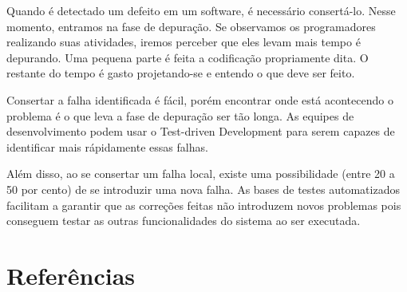 \documentclass[12pt]{article}
\begin{document}
  Quando é detectado um defeito em um software, é necessário consertá-lo. Nesse
  momento, entramos na fase de depuração. Se observamos os programadores 
  realizando suas atividades, iremos perceber que eles levam mais tempo é 
  depurando. Uma pequena parte é feita a codificação propriamente dita. O 
  restante do tempo é gasto projetando-se e entendo o que deve ser feito.

  Consertar a falha identificada é fácil, porém encontrar onde está acontecendo
  o problema é o que leva a fase de depuração ser tão longa. As equipes de 
  desenvolvimento podem usar o Test-driven Development para serem capazes de
  identificar mais rápidamente essas falhas.

  Além disso, ao se consertar um falha local, existe uma possibilidade (entre
  20 a 50 por cento) de se introduzir uma nova falha. As bases de testes 
  automatizados facilitam a garantir que as correções feitas não introduzem 
  novos problemas pois conseguem testar as outras funcionalidades do sistema
  ao ser executada.

  \section{Referências}
\end{document}

